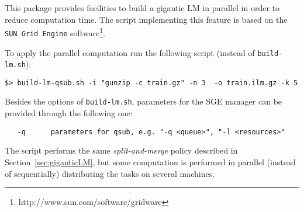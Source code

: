 This package provides facilities to build a gigantic LM in parallel in order to reduce computation time.
The script implementing this feature is based on the {\tt SUN Grid Engine} software\footnote{http://www.sun.com/software/gridware}.

\noindent
To apply the parallel computation run the following script (instead of {\tt build-lm.sh}):

\begin{verbatim}
$> build-lm-qsub.sh -i "gunzip -c train.gz" -n 3  -o train.ilm.gz -k 5
\end{verbatim}
Besides the options of {\tt build-lm.sh}, parameters for the SGE manager can be provided through the following one:

\begin{verbatim}
   -q      parameters for qsub, e.g. "-q <queue>", "-l <resources>"
\end{verbatim}

\noindent
The script performs the same {\em split-and-merge} policy described in Section~\ref{sec:giganticLM}, but some computation is performed in parallel (instead of sequentially) distributing the tasks on several machines.


